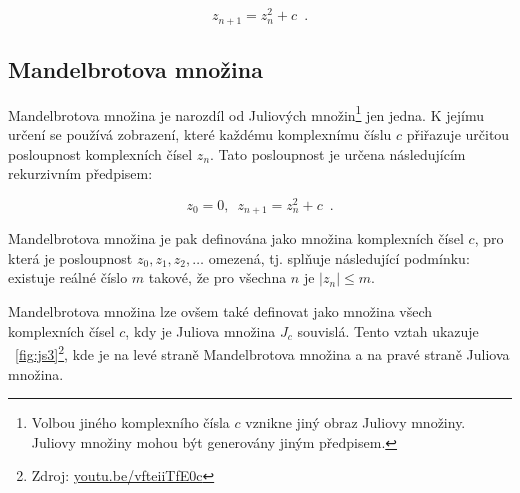 \documentclass[thesis=B, czech]{FITthesis}[2019/03/06]
\begin{document}
\begin{equation} \label{eq:julia}
    {\displaystyle z_{n+1}=z_{n}^2+c}\enspace .
\end{equation}


\subsection*{Mandelbrotova množina}

Mandelbrotova množina je narozdíl od Juliových množin\footnote{Volbou jiného komplexního čísla $c$ vznikne jiný obraz Juliovy množiny. Juliovy množiny mohou být generovány jiným předpisem.} jen jedna. K jejímu určení se používá zobrazení, které každému komplexnímu číslu $c$ přiřazuje určitou posloupnost komplexních čísel $z_{n}$. Tato posloupnost je určena následujícím rekurzivním předpisem:

\begin{equation} \label{eq:mandelbrot}
    {\displaystyle z_0=0,\enspace z_{n+1}=z_{n}^2+c}\enspace .
\end{equation}

Mandelbrotova množina je pak definována jako množina komplexních čísel $c$, pro která je posloupnost $z_{0},z_{1},z_{2},\dots$   omezená, tj. splňuje následující podmínku: existuje reálné číslo $m$ takové, že pro všechna $n$ je $|z_n| \leq m$. 


Mandelbrotova množina lze ovšem také definovat jako množina všech komplexních čísel $c$, kdy je Juliova množina $J_c$ souvislá. Tento vztah ukazuje \figurename~\ref{fig:js3}\footnote{Zdroj: \url{youtu.be/vfteiiTfE0c}}, kde je na levé straně Mandelbrotova množina a na pravé straně Juliova množina.
\end{document}
